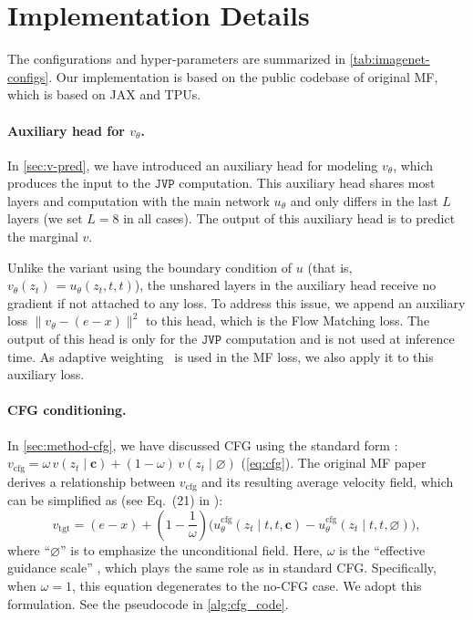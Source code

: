 \clearpage
\appendix

\section{Implementation Details}
\label{app:exp-settings}



The configurations and hyper-parameters are summarized in \cref{tab:imagenet-configs}. Our implementation is based on the public codebase of original MF, which is based on JAX and TPUs.\footnotemark{}


\paragraph{Auxiliary head for $v_\theta$.} In \cref{sec:v-pred}, we have introduced an auxiliary head for modeling $v_\theta$, which produces the input to the $\mathtt{JVP}$ computation. This auxiliary head shares most layers and computation with the main network $u_\theta$ and only differs in the last $L$ layers (we set $L=8$ in all cases). The output of this auxiliary head is to predict the marginal $v$.

Unlike the variant using the boundary condition of $u$ (that is, $v_\theta(z_t)\,=u_\theta(z_t, t, t)$), the unshared layers in the auxiliary head receive no gradient if not attached to any loss. To address this issue, we append an auxiliary loss $\|v_\theta - (e-x)\|^2$ to this head, which is the Flow Matching loss. The output of this head is only for the $\mathtt{JVP}$ computation and is not used at inference time.
As adaptive weighting~\cite{mf} is used in the MF loss, we also apply it to this auxiliary loss.

\paragraph{CFG conditioning.} In \cref{sec:method-cfg}, we have discussed CFG using the standard form \cite{cfg}: $v_{\text{cfg}} = \omega\,v(z_t\mid\mathbf{c}) + (1-\omega)\,v(z_t \mid \varnothing)$ (\cref{eq:cfg}).
The original MF paper \cite{mf} derives a relationship between $v_{\text{cfg}}$ and its resulting average velocity field, which can be simplified as (see Eq.~(21) in \cite{mf}):
\begin{equation}
    v_{\text{tgt}}=(e-x)+(1-\frac{1}{\omega})\big(u^\text{cfg}_\theta(z_t\mid t,t,\mathbf{c}) - u^\text{cfg}_\theta(z_t\mid t,t, \varnothing)\big),
\end{equation}
where ``$\varnothing$'' is to emphasize the unconditional field. 
Here, $\omega$ is the ``effective guidance scale'' \cite{mf}, which plays the same role as in standard CFG.
Specifically, when $\omega=1$, this equation degenerates to the no-CFG case. 
We adopt this formulation.
See the pseudocode in \cref{alg:cfg_code}. 

